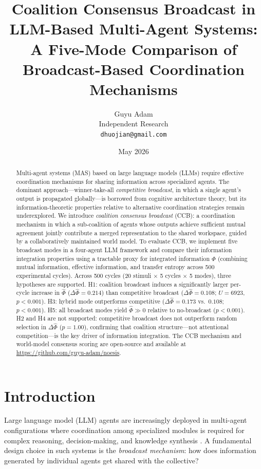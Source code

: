 \documentclass[11pt]{article}
\title{Coalition Consensus Broadcast in LLM-Based Multi-Agent Systems:\\
A Five-Mode Comparison of Broadcast-Based Coordination Mechanisms}
\author{Guyu Adam\\
Independent Research\\
\texttt{dhuojian@gmail.com}}
\date{May 2026}
\theoremstyle{definition}
\begin{document}
\maketitle

\begin{abstract}
Multi-agent systems (MAS) based on large language models (LLMs) require effective
coordination mechanisms for sharing information across specialized agents. The dominant
approach---winner-take-all \emph{competitive broadcast}, in which a single agent's output
is propagated globally---is borrowed from cognitive architecture theory, but its information-theoretic
properties relative to alternative coordination strategies remain underexplored. We
introduce \emph{coalition consensus broadcast} (CCB): a coordination mechanism in which
a sub-coalition of agents whose outputs achieve sufficient mutual agreement jointly
contribute a merged representation to the shared workspace, guided by a collaboratively
maintained world model. To evaluate CCB, we implement five broadcast modes in a
four-agent LLM framework and compare their information integration properties using a
tractable proxy for integrated information $\Phi$ (combining mutual information,
effective information, and transfer entropy across 500 experimental cycles).
Across 500 cycles (20 stimuli $\times$ 5 cycles $\times$ 5 modes), three hypotheses
are supported. H1: coalition broadcast induces a significantly larger per-cycle increase
in $\hat{\Phi}$ ($\Delta\hat{\Phi} = 0.214$) than competitive broadcast ($\Delta\hat{\Phi}
= 0.108$; $U = 6923$, $p < 0.001$). H3: hybrid mode outperforms competitive
($\Delta\hat{\Phi} = 0.173$ vs.\ $0.108$; $p < 0.001$). H5: all broadcast modes yield
$\hat{\Phi} \gg 0$ relative to no-broadcast ($p < 0.001$). H2 and H4 are not supported:
competitive broadcast does not outperform random selection in $\Delta\hat{\Phi}$
($p = 1.00$), confirming that coalition structure---not attentional competition---is the
key driver of information integration. The CCB mechanism and world-model consensus scoring
are open-source and available at \url{https://github.com/guyu-adam/noesis}.
\end{abstract}

\section{Introduction}
\label{sec:intro}

Large language model (LLM) agents are increasingly deployed in multi-agent configurations
where coordination among specialized modules is required for complex reasoning, decision-making,
and knowledge synthesis \citep{park2023,yao2023,wu2023}. A fundamental design choice in
such systems is the \emph{broadcast mechanism}: how does information generated by individual
agents get shared with the collective?
\end{document}
